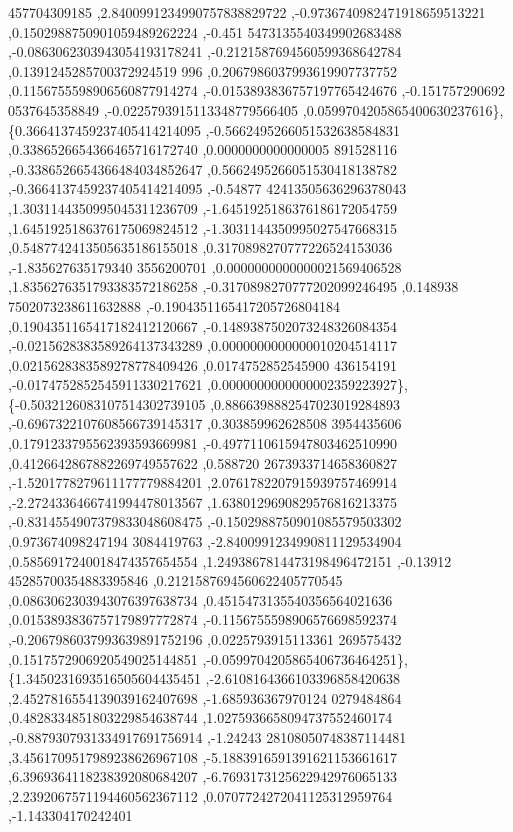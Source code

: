 \begin{DoxyCode}
      457704309185 ,2.8400991234990757838829722 ,-0.9736740982471918659513221 ,0.1502988750901059489262224 ,-0.451
      5473135540349902683488 ,-0.0863062303943054193178241 ,-0.2121587694560599368642784 ,0.1391245285700372924519
      996 ,0.2067986037993619907737752 ,0.1156755598906560877914274 ,-0.0153893836757197765424676 ,-0.151757290692
      0537645358849 ,-0.0225793915113348779566405 ,0.0599704205865400630237616\},
\{0.3664137459237405414214095 ,-0.5662495266051532638584831 ,0.3386526654366465716172740 ,0.0000000000000005
      891528116 ,-0.3386526654366484034852647 ,0.5662495266051530418138782 ,-0.3664137459237405414214095 ,-0.54877
      42413505636296378043 ,1.3031144350995045311236709 ,-1.6451925186376186172054759 ,1.6451925186376175069824512
       ,-1.3031144350995027547668315 ,0.5487742413505635186155018 ,0.3170898270777226524153036 ,-1.835627635179340
      3556200701 ,0.0000000000000021569406528 ,1.8356276351793383572186258 ,-0.3170898270777202099246495 ,0.148938
      7502073238611632888 ,-0.1904351165417205726804184 ,0.1904351165417182412120667 ,-0.1489387502073248326084354
       ,-0.0215628383589264137343289 ,0.0000000000000010204514117 ,0.0215628383589278778409426 ,0.0174752852545900
      436154191 ,-0.0174752852545911330217621 ,0.0000000000000002359223927\},
\{-0.5032126083107514302739105 ,0.8866398882547023019284893 ,-0.6967322107608566739145317 ,0.303859962628508
      3954435606 ,0.1791233795562393593669981 ,-0.4977110615947803462510990 ,0.4126642867882269749557622 ,0.588720
      2673933714658360827 ,-1.5201778279611177779884201 ,2.0761782207915939757469914 ,-2.2724336466741994478013567
       ,1.6380129690829576816213375 ,-0.8314554907379833048608475 ,-0.1502988750901085579503302 ,0.973674098247194
      3084419763 ,-2.8400991234990811129534904 ,0.5856917240018474357654554 ,1.2493867814473198496472151 ,-0.13912
      45285700354883395846 ,0.2121587694560622405770545 ,0.0863062303943076397638734 ,0.4515473135540356564021636 
      ,0.0153893836757179897772874 ,-0.1156755598906576698592374 ,-0.2067986037993639891752196 ,0.0225793915113361
      269575432 ,0.1517572906920549025144851 ,-0.0599704205865406736464251\},
\{1.3450231693516505604435451 ,-2.6108164366103396858420638 ,2.4527816554139039162407698 ,-1.685936367970124
      0279484864 ,0.4828334851803229854638744 ,1.0275936658094737552460174 ,-0.8879307931334917691756914 ,-1.24243
      28108050748387114481 ,3.4561709517989238626967108 ,-5.1883916591391621153661617 ,6.3969364118238392080684207
       ,-6.7693173125622942976065133 ,2.2392067571194460562367112 ,0.0707724272041125312959764 ,-1.143304170242401

\end{DoxyCode}

